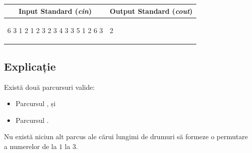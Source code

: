 \documentclass[12pt,a4paper]{article}
\begin{document}
\begin{tabular}{|@{}p{}@{}|@{}p{}@{}|}
\hline
\multicolumn{1}{|c|}{\bfseries Input Standard (\textit{cin})} &
\multicolumn{1}{c|}{\bfseries Output Standard (\textit{cout})} \\
\hline
\begin{textQuoteCell}
6 3
1 2 1
2 3 2
3 4 3
3 5 1
2 6 3
\end{textQuoteCell} &
\begin{textQuoteCell}
2
\end{textQuoteCell} \\    
\hline
\end{tabular}
\vspace{1em}

\subsection*{Explicație}

Există două parcursuri valide:
\begin{itemize}
    \item Parcursul , și
    \item Parcursul .
\end{itemize}

Nu există niciun alt parcus ale cărui lungimi de drumuri să formeze o permutare a numerelor de la $1$ la $3$.
\end{document}
